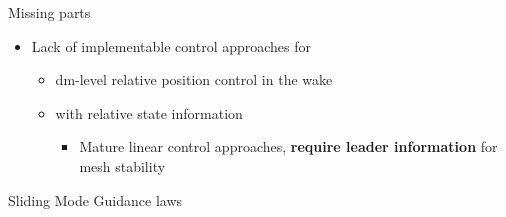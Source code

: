 \documentclass[12pt,svgnames,table,draft=false]{beamer}
\begin{document}
\usebackgroundtemplate{}


\begin{frame}{Missing parts}
\centering
\vspace{-6em}
\begin{tcolorbox}[width=.99\textwidth,
colback={gray!10!},
standard jigsaw,
opacityback=1,  %
]  
\begin{itemize}
\item Lack of implementable control approaches for 
\begin{itemize}
\item dm-level relative position control in the wake 
\item with relative state information
\begin{itemize}
\item Mature linear control approaches, \textbf{require leader information} for mesh stability
\end{itemize}
\end{itemize}
\end{itemize}
\end{tcolorbox}
\end{frame}

\usebackgroundtemplate{}
\begin{frame}
\centering
\Large
\vspace{3em}
Sliding Mode Guidance laws
\end{frame}
\end{document}
